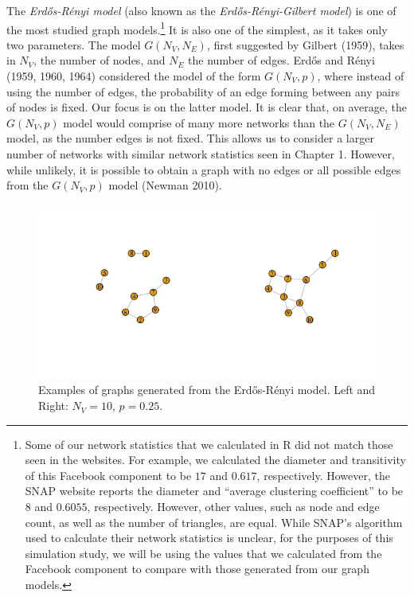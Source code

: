 \documentclass[12pt,twoside]{amherstthesis}
\begin{document}
  The \emph{Erdős-Rényi model} (also known as the
  \emph{Erdős-Rényi-Gilbert model}) is one of the most studied graph
  models.\footnote{Some of our network statistics that we calculated in R
    did not match those seen in the websites. For example, we calculated
    the diameter and transitivity of this Facebook component to be \(17\)
    and \(0.617\), respectively. However, the SNAP website reports the
    diameter and ``average clustering coefficient'' to be \(8\) and
    \(0.6055\), respectively. However, other values, such as node and edge
    count, as well as the number of triangles, are equal. While SNAP's
    algorithm used to calculate their network statistics is unclear, for
    the purposes of this simulation study, we will be using the values
    that we calculated from the Facebook component to compare with those
    generated from our graph models.} It is also one of the simplest, as
  it takes only two parameters. The model \(G(N_V, N_E)\), first suggested
  by Gilbert (1959), takes in \(N_V\), the number of nodes, and \(N_E\)
  the number of edges. Erdős and Rényi (1959, 1960, 1964) considered the
  model of the form \(G(N_{V}, p)\), where instead of using the number of
  edges, the probability of an edge forming between any pairs of nodes is
  fixed. Our focus is on the latter model. It is clear that, on average,
  the \(G(N_{V}, p)\) model would comprise of many more networks than the
  \(G(N_V, N_E)\) model, as the number edges is not fixed. This allows us
  to consider a larger number of networks with similar network statistics
  seen in Chapter 1. However, while unlikely, it is possible to obtain a
  graph with no edges or all possible edges from the \(G(N_{V}, p)\) model
  (Newman 2010).
  
  \begin{figure}[htbp]
  \centering
  \includegraphics{figure/21erdosrenyiexample.png}
  \caption{Examples of graphs generated from the Erdős-Rényi model. Left
  and Right: \(N_V = 10\), \(p = 0.25\).}
  \end{figure}
  
\end{document}
